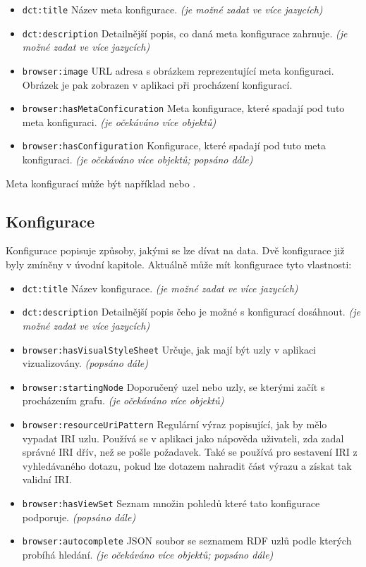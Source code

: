 \begin{itemize}
    \item \texttt{dct:title} Název meta konfigurace. \textit{(je možné zadat ve více jazycích)}
    \item \texttt{dct:description} Detailnější popis, co daná meta konfigurace zahrnuje. \textit{(je možné zadat ve více jazycích)}
    \item \texttt{browser:image} URL adresa s obrázkem reprezentující meta konfiguraci. Obrázek je pak zobrazen v aplikaci při procházení konfigurací.
    \item \texttt{browser:hasMetaConficuration} Meta konfigurace, které spadají pod tuto meta konfiguraci. \textit{(je očekáváno více objektů)}
    \item \texttt{browser:hasConfiguration} Konfigurace, které spadají pod tuto meta konfiguraci. \textit{(je očekáváno více objektů; popsáno dále)}
\end{itemize}

Meta konfigurací může být například  nebo .

\subsection{Konfigurace} \label{pozadavky-konfigurace}
Konfigurace popisuje způsoby, jakými se lze dívat na data. Dvě konfigurace již byly zmíněny v úvodní kapitole. Aktuálně může mít konfigurace tyto vlastnosti:

\begin{itemize}
    \item \texttt{dct:title} Název konfigurace. \textit{(je možné zadat ve více jazycích)}
    \item \texttt{dct:description} Detailnější popis čeho je možné s konfigurací dosáhnout. \textit{(je možné zadat ve více jazycích)}
    \item \texttt{browser:hasVisualStyleSheet} Určuje, jak mají být uzly v aplikaci vizualizovány. \textit{(popsáno dále)}
    \item \texttt{browser:startingNode} Doporučený uzel nebo uzly, se kterými začít s procházením grafu. \textit{(je očekáváno více objektů)}
    \item \texttt{browser:resourceUriPattern} Regulární výraz popisující, jak by mělo vypadat IRI uzlu. Používá se v aplikaci jako nápověda uživateli, zda zadal správné IRI dřív, než se pošle požadavek. Také se používá pro sestavení IRI z vyhledávaného dotazu, pokud lze dotazem nahradit část výrazu a získat tak validní IRI.
    \item \texttt{browser:hasViewSet} Seznam množin pohledů které tato konfigurace podporuje. \textit{(popsáno dále)}
    \item \texttt{browser:autocomplete} JSON soubor se seznamem RDF uzlů podle kterých probíhá hledání. \textit{(je očekáváno více objektů; popsáno dále)}
\end{itemize}

